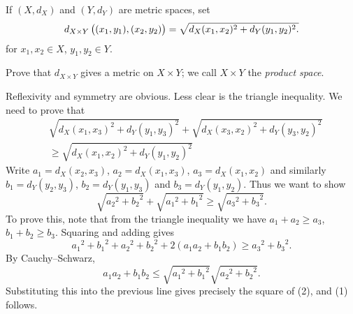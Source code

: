 \begin{prbm}
If $(X,d_X)$ and $(Y,d_Y)$ are metric spaces, set
\[d_{X\times Y}\left((x_1,y_1),(x_2,y_2)\right)=\sqrt{d_X(x_1,x_2)^2+d_Y(y_1,y_2)^2.}\]
for $x_1,x_2\in X$, $y_1,y_2\in Y$.

Prove that $d_{X\times Y}$ gives a metric on $X\times Y$; we call $X\times Y$ the \emph{product space}.
\end{prbm}

\begin{solution}
Reflexivity and symmetry are obvious. Less clear is the triangle inequality. We need to prove that
\begin{equation*}\tag{1}
\begin{split}
&\sqrt{d_X(x_1,x_3)^2+d_Y(y_1,y_3)^2}+\sqrt{d_X(x_3,x_2)^2+d_Y(y_3,y_2)^2}\\
&\ge\sqrt{d_X(x_1,x_2)^2+d_Y(y_1,y_2)^2}
\end{split}
\end{equation*}
Write $a_1=d_X(x_2,x_3)$, $a_2=d_X(x_1,x_3)$, $a_3=d_X(x_1,x_2)$ and similarly $b_1=d_Y(y_2,y_3)$, $b_2=d_Y(y_1,y_3)$ and $b_3=d_Y(y_1,y_2)$. Thus we want to show
\begin{equation*}\tag{2}
\sqrt{{a_2}^2+{b_2}^2}+\sqrt{{a_1}^2+{b_1}^2}\ge\sqrt{{a_3}^2+{b_3}^2}.
\end{equation*}
To prove this, note that from the triangle inequality we have $a_1+a_2\ge a_3$, $b_1+b_2\ge b_3$. Squaring and adding gives
\[{a_1}^2+{b_1}^2+{a_2}^2+{b_2}^2+2(a_1a_2+b_1b_2)\ge {a_3}^2+{b_3}^2.\]
By Cauchy--Schwarz,
\[a_1a_2+b_1b_2\le\sqrt{{a_1}^2+{b_1}^2}\sqrt{{a_2}^2+{b_2}^2}.\]
Substituting this into the previous line gives precisely the square of (2), and (1) follows.
\end{solution}